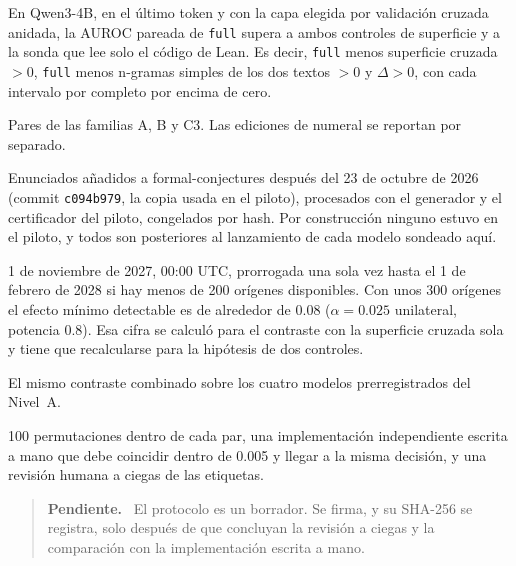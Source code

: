 \documentclass[10pt]{article}
\newcommand{\vr}[1]{\texttt{#1}}
\newcommand{\D}{\Delta}
\newenvironment{pendiente}{\begin{quote}\small\noindent\textbf{Pendiente.}\ }{\end{quote}}
\begin{document}
\begin{description}[leftmargin=1.2em]
\item[Hipótesis] En Qwen3-4B, en el último token y con la capa elegida por validación cruzada anidada, la AUROC
pareada de \vr{full} supera a ambos controles de superficie y a la sonda que lee solo el código de Lean. Es decir, \vr{full} menos superficie cruzada $> 0$, \vr{full} menos n-gramas simples de los dos textos $> 0$ y $\D > 0$, con cada intervalo por completo por encima de cero.
\item[Población] Pares de las familias A, B y C3. Las ediciones de numeral se reportan por separado.
\item[Datos] Enunciados añadidos a formal-conjectures después del 23 de octubre de 2026 (commit \vr{c094b979}, la copia usada en el piloto),
procesados con el generador y el certificador del piloto, congelados por hash. Por construcción ninguno estuvo en el
piloto, y todos son posteriores al lanzamiento de cada modelo sondeado aquí.
\item[Instantánea] 1 de noviembre de 2027, 00:00 UTC, prorrogada una sola vez hasta el 1 de febrero de 2028 si hay menos de 200 orígenes
disponibles. Con unos 300 orígenes el efecto mínimo detectable es de alrededor de 0.08 ($\alpha = 0.025$
unilateral, potencia 0.8). Esa cifra se calculó para el contraste con la superficie cruzada sola y tiene que
recalcularse para la hipótesis de dos controles.
\item[Réplica] El mismo contraste combinado sobre los cuatro modelos prerregistrados del Nivel~A.
\item[Verificaciones] 100 permutaciones dentro de cada par, una implementación independiente escrita a mano que debe
coincidir dentro de 0.005 y llegar a la misma decisión, y una revisión humana a ciegas de las etiquetas.
\end{description}

\begin{pendiente}
El protocolo es un borrador. Se firma, y su SHA-256 se registra, solo después de que concluyan la revisión a ciegas y
la comparación con la implementación escrita a mano.
\end{pendiente}

\end{document}
